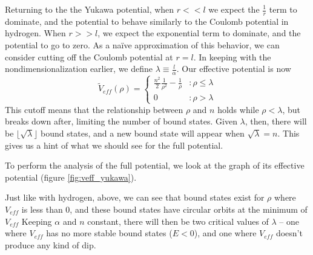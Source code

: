 \documentclass[12pt,twoside]{reedthesis}
\newcommand{\eqn}[1]{\begin{equation}#1\end{equation}}
\begin{document}
Returning to the the Yukawa potential, when $r << l$ we expect the $\frac{1}{r}$ term to dominate, and the potential to behave similarly to the Coulomb potential in hydrogen. When $r >> l$, we expect the exponential term to dominate, and the potential to go to zero. As a na\"ive approximation of this behavior, we can consider cutting off the Coulomb potential at $r = l$. In keeping with the nondimensionalization earlier, we define $\lambda \equiv \frac{l}{\alpha}$. Our effective potential is now
\eqn{
\tilde{V}_{eff}(\rho) = \left\{
\begin{array}{lr}
 \frac{n^2}{2}\frac{1}{\rho^2}-\frac{1}{\rho} & : \rho \leq \lambda \\
0 & : \rho > \lambda
\end{array}
\right.
}
This cutoff means that the relationship between $\rho$ and $n$ holds while $\rho < \lambda$, but breaks down after, limiting the number of bound states. Given $\lambda$, then, there will be $\lfloor \sqrt{\lambda} \rfloor$ bound states, and a new bound state will appear when $\sqrt{\lambda} = n$. This gives us a hint of what we should see for the full potential.

To perform the analysis of the full potential, we look at the graph of its effective potential (figure \ref{fig:veff_yukawa}).
 
Just like with hydrogen, above, we can see that bound states exist for $\rho$ where $V_{eff}$ is less than 0, and these bound states have circular orbits at the minimum of $V_{eff}$ Keeping $\alpha$ and $n$ constant, there will then be two critical values of $\lambda$ -- one where $V_{eff}$ has no more stable bound states ($E < 0$), and one where $V_{eff}$ doesn't produce any kind of dip.
\end{document}
